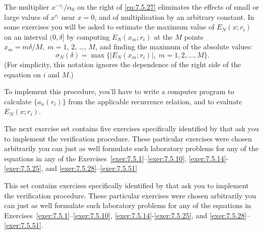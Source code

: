 \medskip

The multiplier $x^{-r_{i}}/\alpha_{0}$ on the right of \eqref{eq:7.5.27} eliminates the effects of
small or large values of $x^{r_{i}}$ near $x=0$, and of multiplication by an arbitrary constant. In
some exercises you will be asked to estimate the maximum value of $E_{N}(x;r_{i})$ on an interval
$(0,\delta]$ by computing $E_{N}(x_{m};r_{i})$ at the $M$ points $x_{m}=m\delta/M,\;m=1$, $2$,
\dots, $M$, and finding the maximum of the absolute values:
\begin{equation}
  \label{eq:7.5.28}\sigma_{N}(\delta)=\max\{|E_{N}(x_{m};r_{i})|,\;m=1,2,\dots,M\}.
\end{equation}
(For simplicity, this notation ignores the dependence of the right side of the equation on $i$ and
$M$.)

To implement this procedure, you'll have to write a computer program to calculate $\{a_{n}(r_{i})\}$
from the applicable recurrence relation, and to evaluate $E_{N}(x;r_{i})$.

The next exercise set contains five exercises specifically identified by \Lex that ask you to
implement the verification procedure. These particular exercises were chosen arbitrarily you can
just as well formulate such laboratory problems for any of the equations in any of the
Exercises~\ref{exer:7.5.1}--\ref{exer:7.5.10}, \ref{exer:7.5.14}-\ref{exer:7.5.25}, and
\ref{exer:7.5.28}--\ref{exer:7.5.51}

\exercises This set contains exercises specifically identified by \Lex that ask you to implement the verification procedure. These particular exercises were chosen arbitrarily you can just as well formulate such laboratory problems for any of the equations in Exercises~\ref{exer:7.5.1}--\ref{exer:7.5.10}, \ref{exer:7.5.14}-\ref{exer:7.5.25}, and \ref{exer:7.5.28}--\ref{exer:7.5.51}.

